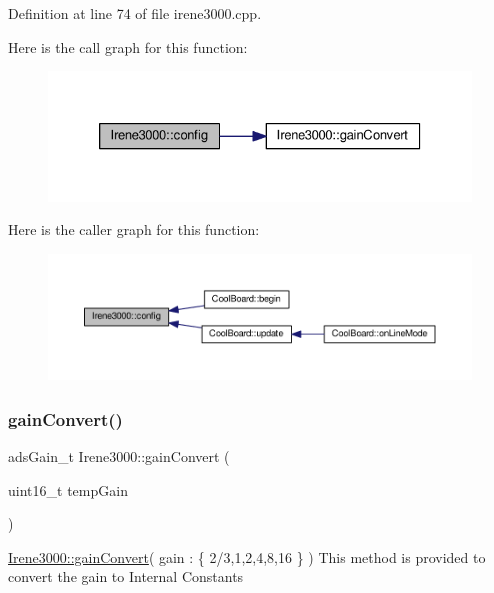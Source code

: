 Definition at line 74 of file irene3000.\+cpp.

Here is the call graph for this function\+:
\nopagebreak
\begin{figure}[H]
\begin{center}
\leavevmode
\includegraphics[width=326pt]{d6/d03/class_irene3000_afed5c35e4b23963c157847ef27c11e9c_cgraph}
\end{center}
\end{figure}
Here is the caller graph for this function\+:
\nopagebreak
\begin{figure}[H]
\begin{center}
\leavevmode
\includegraphics[width=350pt]{d6/d03/class_irene3000_afed5c35e4b23963c157847ef27c11e9c_icgraph}
\end{center}
\end{figure}
\mbox{\label{class_irene3000_abcad62d1201a59f8dd3ba87048002728}} 
\subsubsection{\texorpdfstring{gain\+Convert()}{gainConvert()}}
{\footnotesize\ttfamily ads\+Gain\+\_\+t Irene3000\+::gain\+Convert (\begin{DoxyParamCaption}\item[{uint16\+\_\+t}]{temp\+Gain }\end{DoxyParamCaption})}

\hyperlink{class_irene3000_abcad62d1201a59f8dd3ba87048002728}{Irene3000\+::gain\+Convert}( gain \+: \{ 2/3,1,2,4,8,16 \} ) This method is provided to convert the gain to Internal Constants

